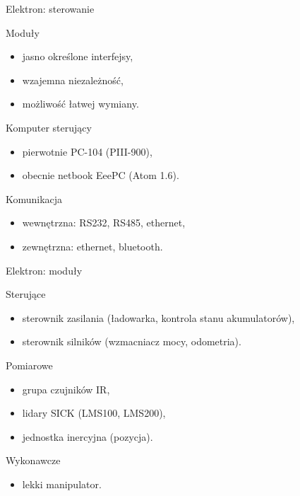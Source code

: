 \documentclass[xcolor=x11names,compress]{beamer}
\renewcommand{\(}{\begin{columns}}
\renewcommand{\)}{\end{columns}}
\newcommand{\<}[1]{\begin{column}{#1}}
\renewcommand{\>}{\end{column}}
\begin{document}
\begin{frame}{Elektron: sterowanie}

    \alert{Moduły}
    \begin{itemize}
    \item jasno określone interfejsy,
    \item wzajemna niezależność,
    \item możliwość łatwej wymiany.
    \end{itemize}

    \vspace{.4cm}
    \pause

    \alert{Komputer sterujący}
    \begin{itemize}
    \item pierwotnie PC-104 (PIII-900),
    \item obecnie netbook EeePC (Atom 1.6).
    \end{itemize}

    \vspace{.4cm}
    \pause

    \alert{Komunikacja}
    \begin{itemize}
    \item wewnętrzna: RS232, RS485, ethernet,
    \item zewnętrzna: ethernet, bluetooth.
    \end{itemize}

\end{frame}


\begin{frame}{Elektron: moduły}

    \alert{Sterujące}
    \begin{itemize}
    \item sterownik zasilania (ładowarka, kontrola stanu akumulatorów),
    \item sterownik silników (wzmacniacz mocy, odometria).
    \end{itemize}

    \vspace{.4cm}
    \pause

    \alert{Pomiarowe}
    \begin{itemize}
    \item grupa czujników IR,
    \item lidary SICK (LMS100, LMS200),
    \item jednostka inercyjna (pozycja).
    \end{itemize}

    \vspace{.4cm}
    \pause

    \alert{Wykonawcze}
    \begin{itemize}
    \item lekki manipulator.
    \end{itemize}

\end{frame}
\end{document}

